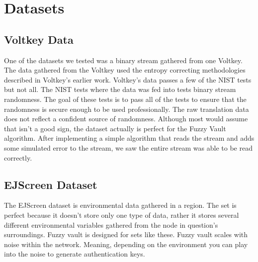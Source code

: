 \section{Datasets}

\subsection{Voltkey Data}

One of the datasets we tested was a binary stream gathered from one Voltkey.
The data gathered from the Voltkey used the entropy correcting methodologies described in Voltkey's earlier work.
Voltkey's data passes a few of the NIST tests but not all.
The NIST tests where the data was fed into tests binary stream randomness.
The goal of these tests is to pass all of the tests to ensure that the randomness is secure enough to be used professionally.
The raw translation data does not reflect a confident source of randomness.
Although most would assume that isn't a good sign, the dataset actually is perfect for the Fuzzy Vault algorithm.
After implementing a simple algorithm that reads the stream and adds some simulated error to the stream, we saw the entire stream was able to be read correctly. %


\subsection{EJScreen Dataset}

The EJScreen dataset is environmental data gathered in a region.
The set is perfect because it doesn't store only one type of data, rather it stores several different environmental variables gathered from the node in question's surroundings.
Fuzzy vault is designed for sets like these.
Fuzzy vault scales with noise within the network.
Meaning, depending on the environment you can play into the noise to generate authentication keys.
